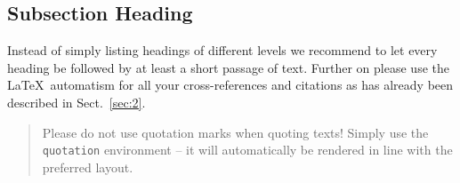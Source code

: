 \documentclass[graybox]{svmult}
\begin{document}





\subsection{Subsection Heading}
\label{subsec:2}
Instead of simply listing headings of different levels we recommend to let every heading be followed by at least a short passage of text.  Further on please use the \LaTeX\ automatism for all your cross-references and citations as has already been described in Sect.~\ref{sec:2}.

\begin{quotation}
Please do not use quotation marks when quoting texts! Simply use the \verb|quotation| environment -- it will automatically be rendered in line with the preferred layout.
\end{quotation}
\end{document}
